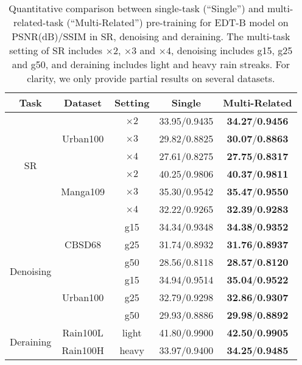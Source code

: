 \documentclass[runningheads]{llncs}
\begin{document}
	\begin{table}[t]
		\caption{Quantitative comparison between single-task (``Single'') and multi-related-task (``Multi-Related'') pre-training for EDT-B model on PSNR(dB)/SSIM in SR, denoising and deraining. The multi-task setting of SR includes $\times 2$, $\times 3$ and $\times 4$, denoising includes g15, g25 and g50, and deraining includes light and heavy rain streaks. For clarity, we only provide partial results on several datasets.}
		\renewcommand\arraystretch{1.2}
		\setlength\tabcolsep{4pt}
		\begin{center}
\begin{tabular}{| c | c | c | c c |}
				\hline
				Task & Dataset & Setting & Single & Multi-Related \\
				\hline
\multirow{6}{*}{SR} & \multirow{3}{*}{Urban100} & $\times 2$ & 33.95/0.9435 & \textbf{34.27}/\textbf{0.9456} \\
				~ & ~ & $\times 3$ & 29.82/0.8825 & \textbf{30.07}/\textbf{0.8863} \\
				~ & ~ & $\times 4$ & 27.61/0.8275 & \textbf{27.75}/\textbf{0.8317} \\
				\cline{2-5}
				~ & \multirow{3}{*}{Manga109} & $\times 2$ & 40.25/0.9806 & \textbf{40.37}/\textbf{0.9811} \\
				~ & ~ & $\times 3$ & 35.30/0.9542 & \textbf{35.47}/\textbf{0.9550} \\
				~ & ~ & $\times 4$ & 32.22/0.9265 & \textbf{32.39}/\textbf{0.9283} \\
				\hline
				\multirow{6}{*}{Denoising} & \multirow{3}{*}{CBSD68} & g15 & 34.34/0.9348 & \textbf{34.38}/\textbf{0.9352} \\
				~ & ~ & g25 & 31.74/0.8932 & \textbf{31.76}/\textbf{0.8937} \\
				~ & ~ & g50 & 28.56/0.8118 & \textbf{28.57}/\textbf{0.8120} \\
				\cline{2-5}
				~ & \multirow{3}{*}{Urban100} & g15 & 34.94/0.9514 & \textbf{35.04}/\textbf{0.9522} \\
				~ & ~ & g25 & 32.79/0.9298 & \textbf{32.86}/\textbf{0.9307} \\
				~ & ~ & g50 & 29.93/0.8886 & \textbf{29.98}/\textbf{0.8892} \\
				\hline
				\multirow{2}{*}{Deraining} & Rain100L & light & 41.80/0.9900 & \textbf{42.50}/\textbf{0.9905} \\
				\cline{2-5}
				~ & Rain100H & heavy & 33.97/0.9400 & \textbf{34.25}/\textbf{0.9485} \\
				\hline
			\end{tabular}
\end{center}
		\vspace{-0.1in}
		\label{tab:singlevsmulti}
\end{table}
	
\end{document}
